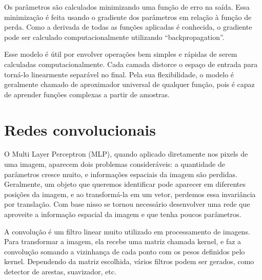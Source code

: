 
Os parâmetros são calculados minimizando
uma função de erro na saída. Essa minimização
é feita usando o gradiente dos parâmetros
em relação à função de perda. Como a derivada
de todas as funções aplicadas é conhecida,
o gradiente pode ser calculado computacionalmente
utilizando ``backpropagation''.




Esse modelo é útil por envolver operações
bem simples e rápidas de serem calculadas
computacionalmente. Cada camada distorce
o espaço de entrada para torná-lo linearmente
separável no final. Pela sua flexibilidade,
o modelo é geralmente chamado de aproximador 
universal de qualquer função, pois
é capaz de aprender funções complexas
a partir de amostras.



\section{Redes convolucionais}



O Multi Layer Perceptron (MLP),
quando aplicado diretamente
nos pixels de uma imagem, aparecem
dois problemas consideráveis:
a quantidade de parâmetros cresce muito,
e informações espaciais da imagem
são perdidas. Geralmente, um objeto
que queremos identificar pode aparecer
em diferentes posições da imagem,
e ao transformá-la em um vetor,
perdemos essa invariância por translação.
Com base nisso se tornou necessário
desenvolver uma rede que aproveite
a informação espacial da imagem
e que tenha poucos parâmetros.


A convolução é um filtro linear 
muito utilizado em processamento
de imagens. Para transformar
a imagem, ela recebe uma matriz
chamada kernel, e faz a convolução
somando a vizinhança de cada ponto
com os pesos definidos pelo kernel.
Dependendo da matriz escolhida,
vários filtros podem ser gerados,
como detector de arestas, suavizador,
etc.

